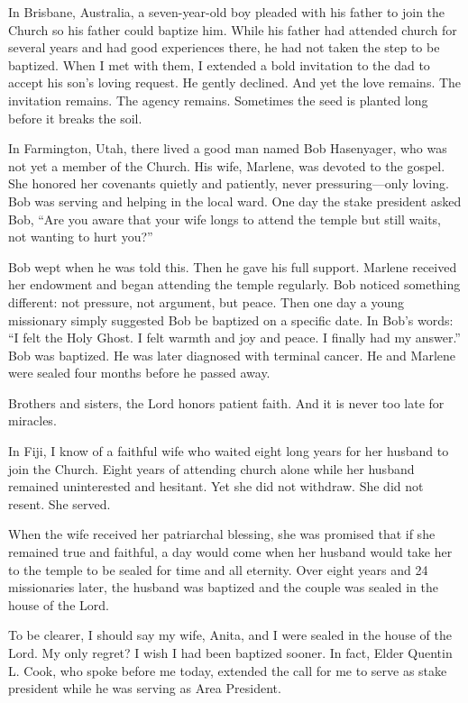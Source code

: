 \documentclass[letterpaper, 11pt]{report}
\begin{document}
In Brisbane, Australia, a seven-year-old boy pleaded with his father to join the Church so his father could baptize him. While his father had attended church for several years and had good experiences there, he had not taken the step to be baptized. When I met with them, I extended a bold invitation to the dad to accept his son’s loving request. He gently declined. And yet the love remains. The invitation remains. The agency remains. Sometimes the seed is planted long before it breaks the soil.

In Farmington, Utah, there lived a good man named Bob Hasenyager, who was not yet a member of the Church. His wife, Marlene, was devoted to the gospel. She honored her covenants quietly and patiently, never pressuring—only loving. Bob was serving and helping in the local ward. One day the stake president asked Bob, “Are you aware that your wife longs to attend the temple but still waits, not wanting to hurt you?”

Bob wept when he was told this. Then he gave his full support. Marlene received her endowment and began attending the temple regularly. Bob noticed something different: not pressure, not argument, but peace. Then one day a young missionary simply suggested Bob be baptized on a specific date. In Bob’s words: “I felt the Holy Ghost. I felt warmth and joy and peace. I finally had my answer.” Bob was baptized. He was later diagnosed with terminal cancer. He and Marlene were sealed four months before he passed away.

Brothers and sisters, the Lord honors patient faith. And it is never too late for miracles.

In Fiji, I know of a faithful wife who waited eight long years for her husband to join the Church. Eight years of attending church alone while her husband remained uninterested and hesitant. Yet she did not withdraw. She did not resent. She served.

When the wife received her patriarchal blessing, she was promised that if she remained true and faithful, a day would come when her husband would take her to the temple to be sealed for time and all eternity. Over eight years and 24 missionaries later, the husband was baptized and the couple was sealed in the house of the Lord.

To be clearer, I should say my wife, Anita, and I were sealed in the house of the Lord. My only regret? I wish I had been baptized sooner. In fact, Elder Quentin L. Cook, who spoke before me today, extended the call for me to serve as stake president while he was serving as Area President.
\end{document}
